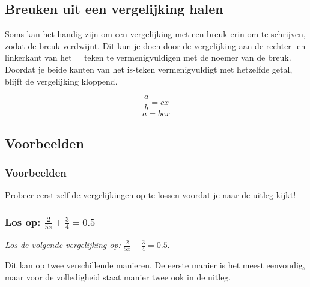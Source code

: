\documentclass[
  a4paper,
]{scrbook}
\theoremstyle{definition}
\theoremstyle{remark}
\begin{document}
\hypertarget{breuken-uit-een-vergelijking-halen}{%
\subsection*{Breuken uit een vergelijking
halen}\label{breuken-uit-een-vergelijking-halen}}

Soms kan het handig zijn om een vergelijking met een breuk erin om te
schrijven, zodat de breuk verdwijnt. Dit kun je doen door de
vergelijking aan de rechter- en linkerkant van het = teken te
vermenigvuldigen met de noemer van de breuk. Doordat je beide kanten van
het is-teken vermenigvuldigt met hetzelfde getal, blijft de vergelijking
kloppend.

\[
\frac{a}{b} = cx
\] \[
a = bcx
\]

\hypertarget{voorbeelden}{%
\subsection*{Voorbeelden}\label{voorbeelden}}

\subsubsection{Voorbeelden}

Probeer eerst zelf de vergelijkingen op te lossen voordat je naar de
uitleg kijkt!

\subsubsection{\texorpdfstring{Los op:
\(\frac{2}{5x}+\frac{3}{4} = 0.5\)}{Los op: \textbackslash frac\{2\}\{5x\}+\textbackslash frac\{3\}\{4\} = 0.5}}

\emph{Los de volgende vergelijking op:}
\(\frac{2}{5x}+\frac{3}{4} = 0.5\).

Dit kan op twee verschillende manieren. De eerste manier is het meest
eenvoudig, maar voor de volledigheid staat manier twee ook in de uitleg.
\end{document}
